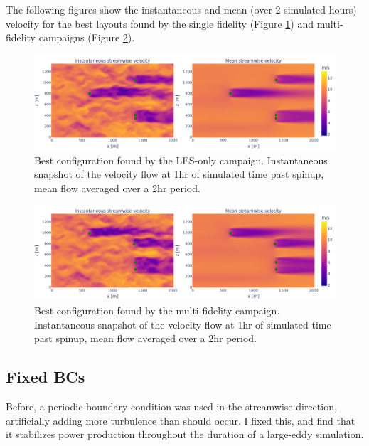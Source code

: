 \documentclass[11pt]{article}
\begin{document}
The following figures show the instantaneous and mean (over 2 simulated hours)
velocity for the best layouts found by the single fidelity (Figure
\ref{fig:les_only_velocity_flow}) and multi-fidelity campaigns (Figure
\ref{fig:multi_fidelity_flow}).

\clearpage

\begin{figure}[htbp]
    \centering
    \includegraphics[scale=0.25]{les_only_146.png}
    \caption{Best configuration found by the LES-only campaign. Instantaneous
        snapshot of the velocity flow at 1hr of simulated time past spinup, mean flow
        averaged over a 2hr period.
    }
    \label{fig:les_only_velocity_flow}
\end{figure}

\begin{figure}[htbp]
    \centering
    \includegraphics[scale=0.25]{mf_743.png}
    \caption{Best configuration found by the multi-fidelity campaign. Instantaneous
        snapshot of the velocity flow at 1hr of simulated time past spinup, mean flow
        averaged over a 2hr period.
    }
    \label{fig:multi_fidelity_flow}
\end{figure}

\subsection{Fixed BCs}
\label{section:bcs}
Before, a periodic boundary condition was used in the streamwise direction, artificially
adding more turbulence than should occur. I fixed this, and find that it stabilizes
power production throughout the duration of a large-eddy simulation.
\end{document}
